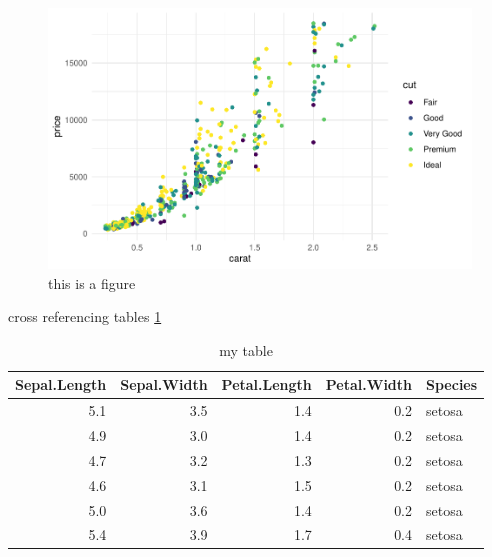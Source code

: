 \documentclass[]{interact}
\theoremstyle{plain}%
\theoremstyle{definition}
\theoremstyle{remark}
\begin{document}
\begin{figure}
\centering
\includegraphics{taylor-francis_files/figure-latex/diamond-plot-1.pdf}
\caption{\label{fig:diamond-plot}this is a figure}
\end{figure}

cross referencing tables \ref{tab:iris}

\begin{table}

\caption{\label{tab:iris}my table}
\centering
\begin{tabular}[t]{r|r|r|r|l}
\hline
Sepal.Length & Sepal.Width & Petal.Length & Petal.Width & Species\\
\hline
5.1 & 3.5 & 1.4 & 0.2 & setosa\\
\hline
4.9 & 3.0 & 1.4 & 0.2 & setosa\\
\hline
4.7 & 3.2 & 1.3 & 0.2 & setosa\\
\hline
4.6 & 3.1 & 1.5 & 0.2 & setosa\\
\hline
5.0 & 3.6 & 1.4 & 0.2 & setosa\\
\hline
5.4 & 3.9 & 1.7 & 0.4 & setosa\\
\hline
\end{tabular}
\end{table}
\end{document}
